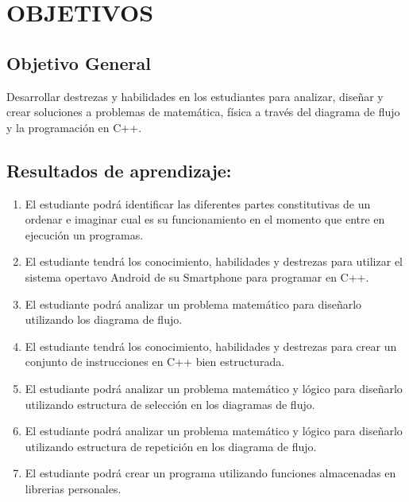\documentclass[a4paper,12pt,spanish]{article}
\newcommand{\ResuApreA}{El estudiante podrá identificar las diferentes partes constitutivas de un ordenar e imaginar cual es su funcionamiento en el momento que entre en ejecución un programas.}
\newcommand{\ResuApreB}{El estudiante tendrá los conocimiento, habilidades y destrezas para utilizar el sistema opertavo Android de su Smartphone para programar en C++.}
\newcommand{\ResuApreC}{El estudiante podrá analizar un problema matemático para diseñarlo utilizando los diagrama de flujo.}
\newcommand{\ResuApreD}{El estudiante tendrá los conocimiento, habilidades y destrezas para crear un conjunto de instrucciones en C++ bien estructurada.}
\newcommand{\ResuApreE}{El estudiante podrá analizar un problema matemático y lógico para  diseñarlo utilizando estructura de selección en los diagramas de flujo.}
\newcommand{\ResuApreF}{El estudiante podrá analizar un problema matemático y lógico para  diseñarlo utilizando estructura de repetición en los diagrama de flujo.}
\newcommand{\ResuApreG}{El estudiante podrá crear un programa utilizando funciones almacenadas en librerias personales.}
\begin{document}
\section{OBJETIVOS}
\subsection{Objetivo General}
Desarrollar destrezas y habilidades en los estudiantes para analizar, diseñar y crear soluciones a problemas de matemática, física a través del diagrama de flujo y la programación  en C++.

\subsection{Resultados de aprendizaje:}

\begin{enumerate}
\item \ResuApreA
\item \ResuApreB
\item \ResuApreC
\item \ResuApreD
\item \ResuApreE
\item \ResuApreF
\item \ResuApreG

\end{enumerate}
\end{document}
